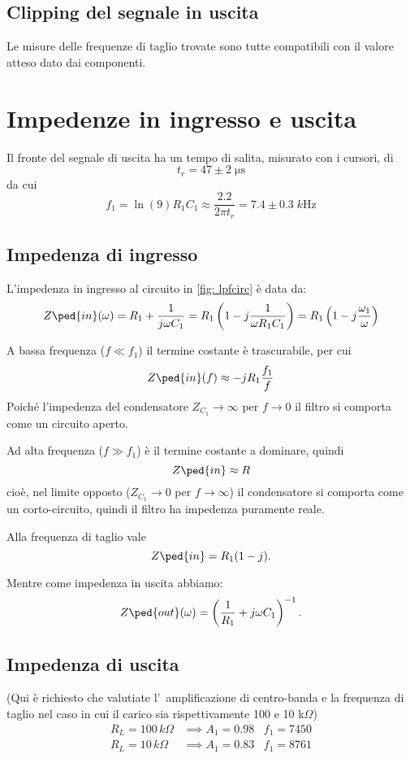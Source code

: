 \documentclass[10pt,a4paper]{article}
\begin{document}
\subsection{Clipping del segnale in uscita}
Le misure delle frequenze di taglio trovate sono tutte compatibili con il
valore atteso dato dai componenti.

\section{Impedenze in ingresso e uscita}
Il fronte del segnale di uscita ha un tempo di salita, misurato con i cursori, 
di 
\[
t_r = 47 \pm 2 \; \si{\micro\second}
\]
da cui 
\[
f_1 = \ln(9) R_1 C_1 \approx \frac{2.2}{2\pi t_r} = 7.4 \pm 0.3 \; \si{k\Hz}
\]

\subsection{Impedenza di ingresso}
L'impedenza in ingresso al circuito in \ref{fig: lpfcirc} è data da:
\[
Z\ped{in}(\omega) = R_1 + \frac{1}{j \omega C_1} =
R_1 \left( 1 - j \frac{1}{\omega R_1 C_1} \right) =
R_1 \left( 1 - j \frac{\omega_1}{\omega} \right)
\]

A bassa frequenza ($f \ll f_1$) il termine costante è trascurabile, per cui
\[
Z\ped{in}(f) \approx -jR_1 \frac{f_1}{f}
\]
Poiché l'impedenza del condensatore $Z_{C_1} \to \infty$ per $f \to 0$
il filtro si comporta come un circuito aperto.

Ad alta frequenza ($f \gg f_1$) è il termine costante a dominare, quindi
\[
Z\ped{in} \approx R
\]
cioè, nel limite opposto ($Z_{C_1} \to 0$ per $f \to \infty$) il
condensatore si comporta come un corto-circuito, quindi il filtro ha
impedenza puramente reale.

Alla frequenza di taglio vale
\[
Z\ped{in} = R_1 (1 - j)
.\]

Mentre come impedenza in uscita abbiamo:
\[
Z\ped{out}(\omega) = \left(\frac{1}{R_1} + j\omega C_1\right)^{-1}
.\]

\subsection{Impedenza di uscita}
(Qui \`e richiesto che valutiate l'~amplificazione di centro-banda e la 
frequenza di taglio nel 
caso in cui il carico sia rispettivamente 100 e 10 k$\Omega$)
\[
\begin{array}{rl}
R_L=100 \,k\Omega & \implies A_1 = 0.98 \;\;\; f_1 = 7450 \\
R_L=10 \,k\Omega & \implies A_1 = 0.83\;\;\; f_1 = 8761 \\
\end{array}
\]
\end{document}
